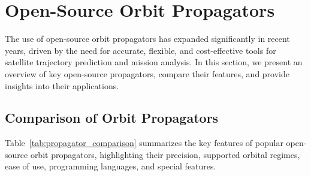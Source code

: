 \documentclass[a4paper,10pt]{article}
\begin{document}
\section{Open-Source Orbit Propagators}
\label{sec:orbit_propagators}

The use of open-source orbit propagators has expanded significantly in recent years, driven by the need for accurate, flexible, and cost-effective tools for satellite trajectory prediction and mission analysis. In this section, we present an overview of key open-source propagators, compare their features, and provide insights into their applications.
\FloatBarrier %

\subsection{Comparison of Orbit Propagators}
Table~\ref{tab:propagator_comparison} summarizes the key features of popular open-source orbit propagators, highlighting their precision, supported orbital regimes, ease of use, programming languages, and special features.

\end{document}
